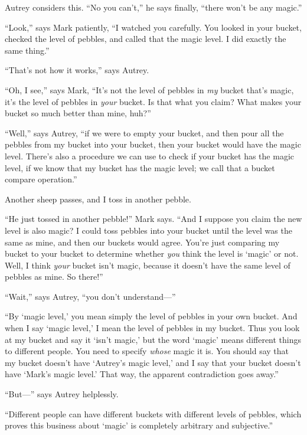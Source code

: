 {
 Autrey considers this. ``No you
can't,'' he says finally,
``there won't be any
magic.''}

{
 ``Look,'' says Mark patiently,
``I watched you carefully. You looked in your bucket,
checked the level of pebbles, and called that the magic level. I did
exactly the same thing.''}

{
 ``That's not how it
works,'' says Autrey.}

{
 ``Oh, I see,'' says Mark,
``It's not the level of pebbles in
\textit{my} bucket that's magic, it's
the level of pebbles in \textit{your} bucket. Is that what you claim?
What makes your bucket so much better than mine,
huh?''}

{
 ``Well,'' says Autrey,
``if we were to empty your bucket, and then pour all
the pebbles from my bucket into your bucket, then your bucket would
have the magic level. There's also a procedure we can
use to check if your bucket has the magic level, if we know that my
bucket has the magic level; we call that a bucket compare
operation.''}

{
 Another sheep passes, and I toss in another pebble.}

{
 ``He just tossed in another
pebble!'' Mark says. ``And I suppose
you claim the new level is also magic? I could toss pebbles into your
bucket until the level was the same as mine, and then our buckets would
agree. You're just comparing my bucket to your bucket
to determine whether \textit{you} think the level is
`magic' or not. Well, I think
\textit{your} bucket isn't magic, because it
doesn't have the same level of pebbles as mine. So
there!''}

{
 ``Wait,'' says Autrey,
``you don't
understand---''}

{
 ``By `magic
level,' you mean simply the level of pebbles in your
own bucket. And when I say `magic
level,' I mean the level of pebbles in my bucket. Thus
you look at my bucket and say it `isn't
magic,' but the word
`magic' means different things to
different people. You need to specify \textit{whose} magic it is. You
should say that my bucket doesn't have
`Autrey's magic level,'
and I say that your bucket doesn't have
`Mark's magic level.'
That way, the apparent contradiction goes away.''}

{
 ``But---'' says Autrey
helplessly.}

{
 ``Different people can have different buckets
with different levels of pebbles, which proves this business about
`magic' is completely arbitrary and
subjective.''}

